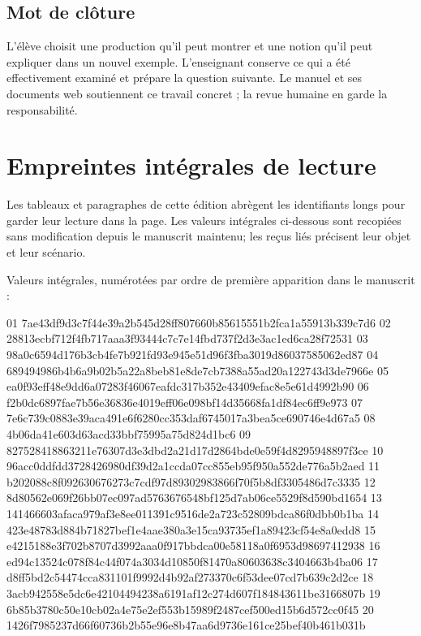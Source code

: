 \documentclass[
  canadien,
  11pt,
  a4paper,
]{report}
\newenvironment{Shaded}{}{}
\newcommand{\NormalTok}[1]{#1}
\begin{document}
\section{Mot de clôture}\label{mot-de-cluxf4ture}

L'élève choisit une production qu'il peut montrer et une notion qu'il
peut expliquer dans un nouvel exemple. L'enseignant conserve ce qui a
été effectivement examiné et prépare la question suivante. Le manuel et
ses documents web soutiennent ce travail concret ; la revue humaine en
garde la responsabilité.

\chapter{Empreintes intégrales de
lecture}\label{empreintes-intuxe9grales-de-lecture}

Les tableaux et paragraphes de cette édition abrègent les identifiants
longs pour garder leur lecture dans la page. Les valeurs intégrales
ci-dessous sont recopiées sans modification depuis le manuscrit
maintenu; les reçus liés précisent leur objet et leur scénario.

Valeurs intégrales, numérotées par ordre de première apparition dans le
manuscrit :

\begin{Shaded}
\begin{Highlighting}[]
\NormalTok{01  7ae43df9d3c7f44e39a2b545d28ff807660b85615551b2fca1a55913b339c7d6}
\NormalTok{02  28813ecbf712f4fb717aaa3f93444c7c7e14fbd737f2d3e3ac1ed6ca28f72531}
\NormalTok{03  98a0c6594d176b3cb4fe7b921fd93e945e51d96f3fba3019d86037585062ed87}
\NormalTok{04  689494986b4b6a9b02b5a22a8beb81e8de7cb7388a55ad20a122743d3de7966e}
\NormalTok{05  ea0f93eff48e9dd6a07283f46067eafdc317b352e43409efac8e5e61d4992b90}
\NormalTok{06  f2b0dc6897fae7b56e36836e4019eff06e098bf14d35668fa1df84ec6ff9e973}
\NormalTok{07  7e6c739c0883e39aca491e6f6280cc353daf6745017a3bea5ce690746e4d67a5}
\NormalTok{08  4b06da41e603d63acd33bbf75995a75d824d1bc6}
\NormalTok{09  827528418863211e76307d3e3dbd2a21d17d2864bde0e59f4d8295948897f3ce}
\NormalTok{10  96acc0ddfdd3728426980df39d2a1ccda07cc855eb95f950a552de776a5b2aed}
\NormalTok{11  b202088c8f092630676273c7cdf97d89302983866f70f5b8df3305486d7c3335}
\NormalTok{12  8d80562e069f26bb07ec097ad5763676548bf125d7ab06ce5529f8d590bd1654}
\NormalTok{13  141466603afaca979af3e8ee011391c9516de2a723c52809bdca86f0dbb0b1ba}
\NormalTok{14  423e48783d884b71827bef1e4aae380a3e15ca93735ef1a89423cf54e8a0edd8}
\NormalTok{15  e4215188e3f702b8707d3992aaa0f917bbdca00e58118a0f6953d98697412938}
\NormalTok{16  ed94c13524c078f84c44f074a3034d10850f81470a80603638c3404663b4ba06}
\NormalTok{17  d8ff5bd2c54474cca831101f9992d4b92af273370c6f53dee07cd7b639c2d2ce}
\NormalTok{18  3acb942558e5dc6e42104494238a6191af12c274d607f184843611be3166807b}
\NormalTok{19  6b85b3780c50e10cb02a4e75e2ef553b15989f2487cef500ed15b6d572cc0f45}
\NormalTok{20  1426f7985237d66f60736b2b55e96e8b47aa6d9736e161ce25bef40b461b031b}
\end{Highlighting}
\end{Shaded}
\end{document}
